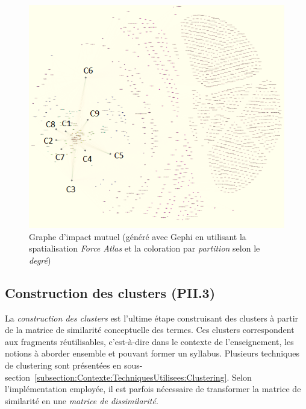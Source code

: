 \begin{figure}[ht!]
\centering
\centerline{  %
\includegraphics[scale=0.78]{3-Methode-CREA/images/2-analyse-structurelle/exemple_graphe_large_cours.png}
}
\caption{Graphe d'impact mutuel (généré avec Gephi en utilisant la spatialisation \textit{Force Atlas} et la coloration par \textit{partition} selon le \textit{degré})}
\label{figure:3-II-2-Graphe-cours}
\end{figure}



\clearpage

\subsection{Construction des clusters (PII.3)}
\label{subsection:CREA:PII.3-ConstructionClusters}

La \textit{construction des clusters} est l'ultime étape construisant des clusters à partir de la matrice de similarité conceptuelle des termes.
Ces clusters correspondent aux fragments réutilisables, c'est-à-dire dans le contexte de l'enseignement, les notions à aborder ensemble et pouvant former un syllabus.
Plusieurs techniques de clustering sont présentées en sous-section~\ref{subsection:Contexte:TechniquesUtilisees:Clustering}.
Selon l'implémentation employée, il est parfois nécessaire de transformer la matrice de similarité en une \textit{matrice de dissimilarité}.

